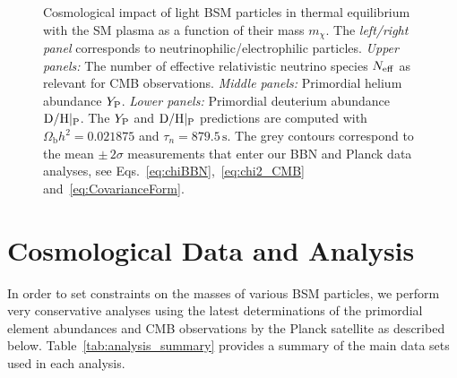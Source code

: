 \begin{figure}[h]
    \caption{Cosmological impact of light BSM particles in thermal equilibrium with the SM plasma as a function of their mass $m_\chi$. The \textit{left/right panel} corresponds to neutrinophilic/electrophilic particles. \textit{Upper panels:} The number of effective relativistic neutrino species $N_{\rm eff}$ as relevant for CMB observations. \textit{Middle panels:} Primordial helium abundance $Y_{\rm P}$. \textit{Lower panels:} Primordial deuterium abundance ${\rm D/H}|_{\rm P}$. The $Y_{\rm P}$ and ${\rm D/H}|_{\rm P}$ predictions are computed with $\Omega_{\mathrm{b}} h^2 = 0.021875$ and $\tau_n = 879.5\,\text{s}$. The grey contours correspond to the mean $\pm \, 2\sigma$ measurements that enter our BBN and Planck data analyses, see Eqs.~\eqref{eq:chiBBN},~\eqref{eq:chi2_CMB}  and~\eqref{eq:CovarianceForm}.}
    \label{fig:Cosmoimply}
\end{figure}
\clearpage
\section{Cosmological Data and Analysis}\label{sec:current_data_analyis}
\vspace{-0.05 cm}

In order to set constraints on the masses of various BSM particles, we perform very conservative analyses using the latest determinations of the primordial element abundances and CMB observations by the Planck satellite as described below. Table~\ref{tab:analysis_summary} provides a summary of the main data sets used in each analysis. 


